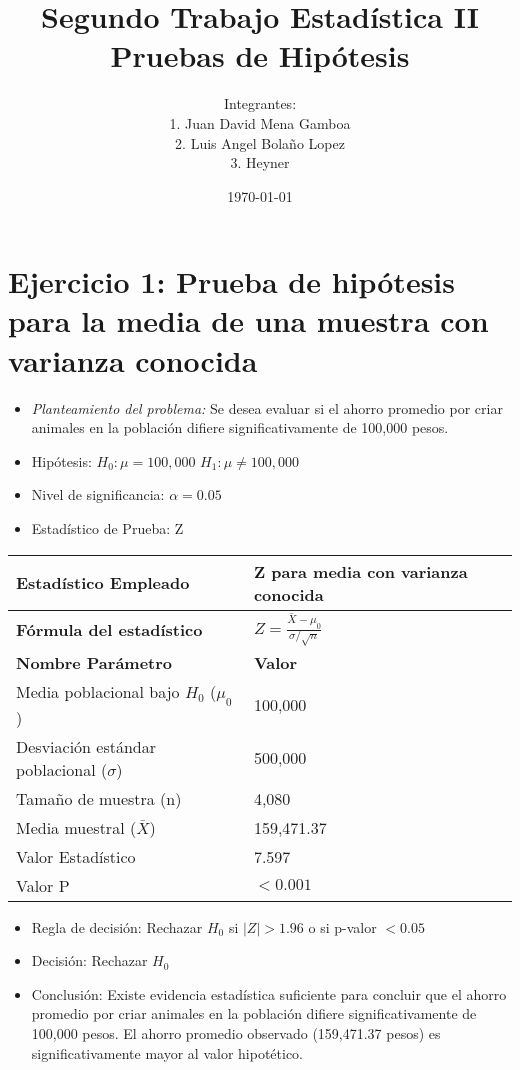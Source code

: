 \documentclass[12pt,a4paper]{article}
\title{\textbf{Segundo Trabajo Estadística II} \\[0.5cm]
Pruebas de Hipótesis}
\author{
Integrantes: \\ 
1. Juan David Mena Gamboa \\ 
2. Luis Angel Bolaño Lopez \\ 
3. Heyner}
\date{\today}
\begin{document}
\maketitle

\section*{Ejercicio 1: Prueba de hipótesis para la media de una muestra con varianza conocida}
\begin{itemize}
    \item \textit{Planteamiento del problema:} Se desea evaluar si el ahorro promedio por criar animales en la población difiere significativamente de 100,000 pesos.
    \item Hipótesis: \quad $H_0: \mu = 100,000$ \hspace{2cm} $H_1: \mu \neq 100,000$
    \item Nivel de significancia: $\alpha = 0.05$
    \item Estadístico de Prueba: Z
\end{itemize}

\begin{tabular}{|m{7cm}|m{7cm}|}
\hline
\textbf{Estadístico Empleado} & Z para media con varianza conocida \\ \hline
\textbf{Fórmula del estadístico} & $Z = \frac{\bar{X} - \mu_0}{\sigma/\sqrt{n}}$ \\ \hline
\textbf{Nombre Parámetro} & \textbf{Valor} \\ \hline
Media poblacional bajo $H_0$ ($\mu_0$) & 100,000 \\ \hline
Desviación estándar poblacional ($\sigma$) & 500,000 \\ \hline
Tamaño de muestra (n) & 4,080 \\ \hline
Media muestral ($\bar{X}$) & 159,471.37 \\ \hline
Valor Estadístico & 7.597 \\ \hline
Valor P & $< 0.001$ \\ \hline
\end{tabular}

\begin{itemize}
    \item Regla de decisión: Rechazar $H_0$ si $|Z| > 1.96$ o si p-valor $< 0.05$
    \item Decisión: Rechazar $H_0$
    \item Conclusión: Existe evidencia estadística suficiente para concluir que el ahorro promedio por criar animales en la población difiere significativamente de 100,000 pesos. El ahorro promedio observado (159,471.37 pesos) es significativamente mayor al valor hipotético.
\end{itemize}
\end{document}
